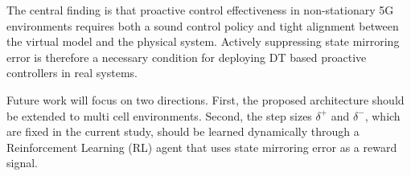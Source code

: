 \documentclass[conference]{IEEEtran}
\begin{document}
The central finding is that proactive control effectiveness in non-stationary 5G environments requires both a sound control policy and tight alignment between the virtual model and the physical system. Actively suppressing state mirroring error is therefore a necessary condition for deploying DT based proactive controllers in real systems.

Future work will focus on two directions. First, the proposed architecture should be extended to multi cell environments. Second, the step sizes $\delta^{+}$ and $\delta^{-}$, which are fixed in the current study, should be learned dynamically through a Reinforcement Learning (RL) agent that uses state mirroring error as a reward signal.

\end{document}
